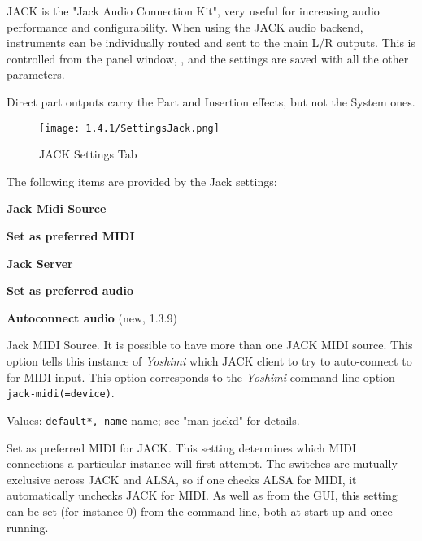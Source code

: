    JACK is the "Jack Audio Connection Kit", very useful for increasing audio
   performance and configurability.
   When using the JACK audio backend, instruments can be individually routed
   and sent to the main L/R outputs. This is controlled from the
   panel window,
   ,
   and the settings are saved with all the other parameters.

   Direct part outputs carry the Part and Insertion effects, but not the
   System ones.

\begin{figure}[H]
   \centering 
   \texttt{[image: 1.4.1/SettingsJack.png]}
   \caption[JACK Settings]{JACK Settings Tab}
   \label{fig:yoshimi_settings_jack_tab}
\end{figure}

   The following items are provided by the Jack settings:

   \begin{enumber}
      \item \textbf{Jack Midi Source}
      \item \textbf{Set as preferred MIDI}
      \item \textbf{Jack Server}
      \item \textbf{Set as preferred audio}
      \item \textbf{Autoconnect audio} (new, 1.3.9)
   \end{enumber}

   \setcounter{ItemCounter}{0}      %

   Jack MIDI Source.
   It is possible to have more than one JACK MIDI source.  This option
   tells this instance of \textsl{Yoshimi} which JACK
   client to try to auto-connect to for MIDI input.
   This option corresponds to the \textsl{Yoshimi} command line option
   \texttt{--jack-midi(=device)}.

   Values: \texttt{default*, name} name; see "man jackd" for details.

   Set as preferred MIDI for JACK.
   This setting determines which MIDI connections a particular instance will
   first attempt. The switches are mutually exclusive across JACK and ALSA,
   so if one checks ALSA for MIDI, it automatically unchecks JACK for MIDI.
   As well as from the GUI, this setting can be set (for instance 0) from the
   command line, both at start-up and once running.

